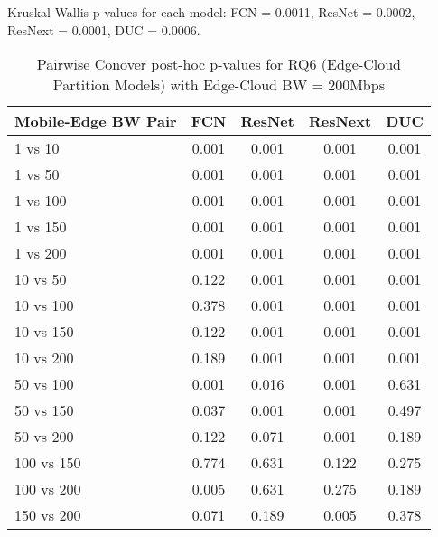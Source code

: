 \begin{table}[h]
\centering
\caption{Pairwise Conover post-hoc p-values for RQ6 (Edge-Cloud Partition Models) with Edge-Cloud BW = 200Mbps}
\label{tab:conover_edge_cloud_partition_ec200}
\smallskip
Kruskal-Wallis p-values for each model: FCN = 0.0011, ResNet = 0.0002, ResNext = 0.0001, DUC = 0.0006.

\begin{tabular}{lcccc}
\toprule
Mobile-Edge BW Pair & FCN & ResNet & ResNext & DUC \\
\midrule
1 vs 10 & 0.001 & 0.001 & 0.001 & 0.001 \\
1 vs 50 & 0.001 & 0.001 & 0.001 & 0.001 \\
1 vs 100 & 0.001 & 0.001 & 0.001 & 0.001 \\
1 vs 150 & 0.001 & 0.001 & 0.001 & 0.001 \\
1 vs 200 & 0.001 & 0.001 & 0.001 & 0.001 \\
10 vs 50 & 0.122 & 0.001 & 0.001 & 0.001 \\
10 vs 100 & 0.378 & 0.001 & 0.001 & 0.001 \\
10 vs 150 & 0.122 & 0.001 & 0.001 & 0.001 \\
10 vs 200 & 0.189 & 0.001 & 0.001 & 0.001 \\
50 vs 100 & 0.001 & 0.016 & 0.001 & 0.631 \\
50 vs 150 & 0.037 & 0.001 & 0.001 & 0.497 \\
50 vs 200 & 0.122 & 0.071 & 0.001 & 0.189 \\
100 vs 150 & 0.774 & 0.631 & 0.122 & 0.275 \\
100 vs 200 & 0.005 & 0.631 & 0.275 & 0.189 \\
150 vs 200 & 0.071 & 0.189 & 0.005 & 0.378 \\
\bottomrule
\end{tabular}
\end{table}

